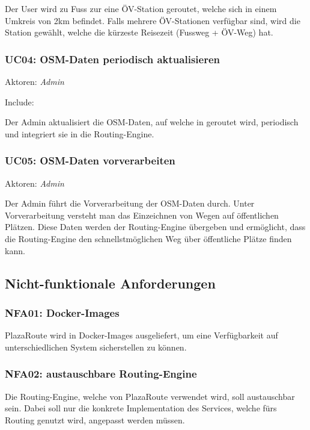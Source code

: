 Der User wird zu Fuss zur eine ÖV-Station geroutet, welche sich in einem Umkreis von 2km befindet. Falls mehrere ÖV-Stationen verfügbar sind, wird die Station gewählt, welche die kürzeste Reisezeit (Fussweg + ÖV-Weg) hat.

\subsubsection{UC04: OSM-Daten periodisch aktualisieren}
\label{usecase:UC04}
Aktoren: \emph{Admin}

Include: 

Der Admin aktualisiert die \ac{OSM}-Daten, auf welche in  geroutet wird, periodisch und integriert sie in die Routing-Engine.

\subsubsection{UC05: OSM-Daten vorverarbeiten}
\label{usecase:UC05}
Aktoren: \emph{Admin}

Der Admin führt die Vorverarbeitung der \ac{OSM}-Daten durch. Unter Vorverarbeitung versteht man das Einzeichnen von Wegen auf öffentlichen Plätzen. Diese Daten werden der Routing-Engine übergeben und ermöglicht, dass die Routing-Engine den schnellstmöglichen Weg über öffentliche Plätze finden kann.

\subsection{Nicht-funktionale Anforderungen}
\label{sub:Nicht-funktionale Anforderungen}

\subsubsection{NFA01: Docker-Images}
\label{NFA:NFA01}

PlazaRoute wird in Docker-Images ausgeliefert, um eine Verfügbarkeit auf unterschiedlichen System sicherstellen zu können.

\subsubsection{NFA02: austauschbare Routing-Engine}
\label{NFA:NFA02}

Die Routing-Engine, welche von PlazaRoute verwendet wird, soll austauschbar sein. Dabei soll nur die konkrete Implementation des Services, welche fürs Routing genutzt wird, angepasst werden müssen.

